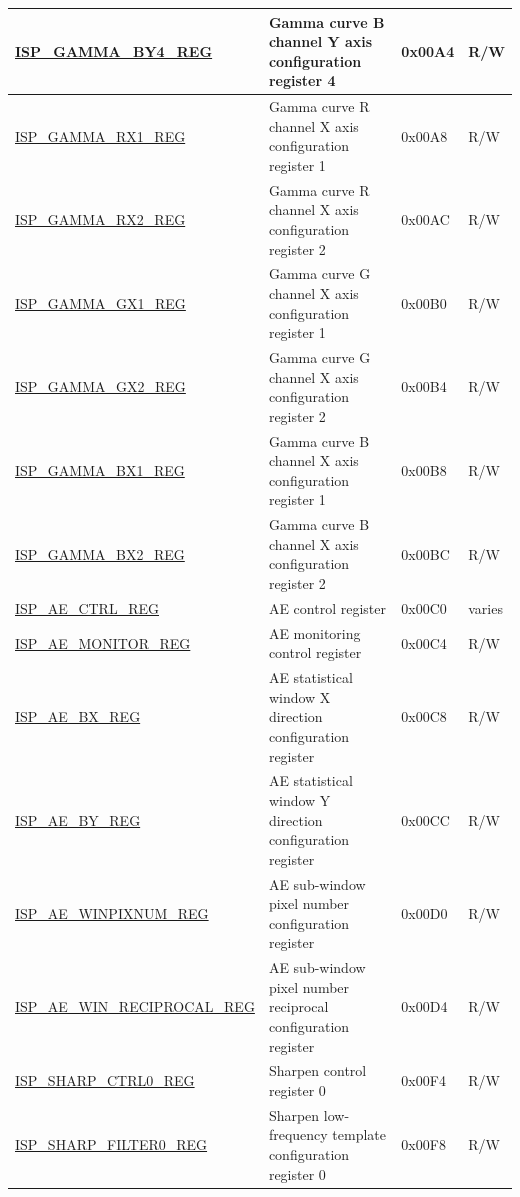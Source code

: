 \begin{longtable}{ | p{6cm} | p{7.2cm} | p{1.3cm} | p{1cm} | }
\hyperref[regdesc:ISPGAMMABY4REG]{ISP\_GAMMA\_BY4\_REG} & Gamma curve B channel Y axis configuration register 4 & 0x00A4 & R/W \\ \hline
\hyperref[regdesc:ISPGAMMARX1REG]{ISP\_GAMMA\_RX1\_REG} & Gamma curve R channel X axis configuration register 1 & 0x00A8 & R/W \\ \hline
\hyperref[regdesc:ISPGAMMARX2REG]{ISP\_GAMMA\_RX2\_REG} & Gamma curve R channel X axis configuration register 2 & 0x00AC & R/W \\ \hline
\hyperref[regdesc:ISPGAMMAGX1REG]{ISP\_GAMMA\_GX1\_REG} & Gamma curve G channel X axis configuration register 1 & 0x00B0 & R/W \\ \hline
\hyperref[regdesc:ISPGAMMAGX2REG]{ISP\_GAMMA\_GX2\_REG} & Gamma curve G channel X axis configuration register 2 & 0x00B4 & R/W \\ \hline
\hyperref[regdesc:ISPGAMMABX1REG]{ISP\_GAMMA\_BX1\_REG} & Gamma curve B channel X axis configuration register 1 & 0x00B8 & R/W \\ \hline
\hyperref[regdesc:ISPGAMMABX2REG]{ISP\_GAMMA\_BX2\_REG} & Gamma curve B channel X axis configuration register 2 & 0x00BC & R/W \\ \hline
\hyperref[regdesc:ISPAECTRLREG]{ISP\_AE\_CTRL\_REG} & AE control register & 0x00C0 & varies \\ \hline
\hyperref[regdesc:ISPAEMONITORREG]{ISP\_AE\_MONITOR\_REG} & AE monitoring control register & 0x00C4 & R/W \\ \hline
\hyperref[regdesc:ISPAEBXREG]{ISP\_AE\_BX\_REG} & AE statistical window X direction configuration register & 0x00C8 & R/W \\ \hline
\hyperref[regdesc:ISPAEBYREG]{ISP\_AE\_BY\_REG} & AE statistical window Y direction configuration register & 0x00CC & R/W \\ \hline
\hyperref[regdesc:ISPAEWINPIXNUMREG]{ISP\_AE\_WINPIXNUM\_REG} & AE sub-window pixel number configuration register & 0x00D0 & R/W \\ \hline
\hyperref[regdesc:ISPAEWINRECIPROCALREG]{ISP\_AE\_WIN\_RECIPROCAL\_REG} & AE sub-window pixel number reciprocal configuration register & 0x00D4 & R/W \\ \hline
\hyperref[regdesc:ISPSHARPCTRL0REG]{ISP\_SHARP\_CTRL0\_REG} & Sharpen control register 0 & 0x00F4 & R/W \\ \hline
\hyperref[regdesc:ISPSHARPFILTER0REG]{ISP\_SHARP\_FILTER0\_REG} & Sharpen low-frequency template configuration register 0 & 0x00F8 & R/W \\ \hline

\end{longtable}
